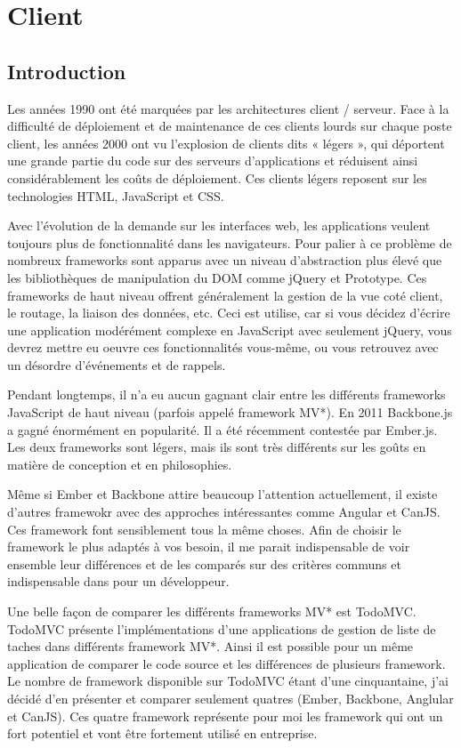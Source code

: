 \chapter{Client}
\label{ch:client}

\section{Introduction}

Les années 1990 ont été marquées par les architectures client / serveur. Face à la difficulté de déploiement et de maintenance de ces clients lourds sur chaque poste client, les années 2000 ont vu l’explosion de clients dits « légers », qui déportent une grande partie du code sur des serveurs d’applications et réduisent ainsi considérablement les coûts de déploiement. Ces clients légers reposent sur les technologies HTML, JavaScript et CSS.

Avec l'évolution de la demande sur les interfaces web, les applications veulent toujours plus de fonctionnalité dans les navigateurs. Pour palier à ce problème de nombreux frameworks sont apparus avec un niveau d'abstraction plus élevé que les bibliothèques de manipulation du DOM comme jQuery et Prototype. Ces frameworks de haut niveau offrent généralement la gestion de la vue coté client, le routage, la liaison des données, etc. Ceci est utilise, car si vous décidez d'écrire une application modérément complexe en JavaScript avec seulement jQuery, vous devrez mettre eu oeuvre ces fonctionnalités vous-même, ou vous retrouvez avec un désordre d'événements et de rappels.

Pendant longtemps, il n'a eu aucun gagnant clair entre les différents frameworks JavaScript de haut niveau (parfois appelé framework MV*). En 2011 Backbone.js a gagné énormément en popularité. Il a été récemment contestée par Ember.js. Les deux frameworks sont légers, mais ils sont très différents sur les goûts en matière de conception et en philosophies. 

Même si Ember et Backbone attire beaucoup l'attention actuellement, il existe d'autres framewokr avec des approches intéressantes comme Angular et CanJS. Ces framework font sensiblement tous la même choses. Afin de choisir le framework le plus adaptés à vos besoin, il me parait indispensable de voir ensemble leur différences et de les comparés sur des critères communs et indispensable dans pour un développeur.

Une belle façon de comparer les différents frameworks MV* est TodoMVC. TodoMVC  présente l'implémentations d'une applications de gestion de liste de taches dans différents framework MV*. Ainsi il est possible pour un même application de comparer le code source et les différences de plusieurs framework. Le nombre de framework disponible sur TodoMVC étant d'une cinquantaine, j'ai décidé d'en présenter et comparer seulement quatres (Ember, Backbone, Anglular et CanJS).  Ces quatre framework représente pour moi les framework qui ont un fort potentiel et vont être fortement utilisé en entreprise.